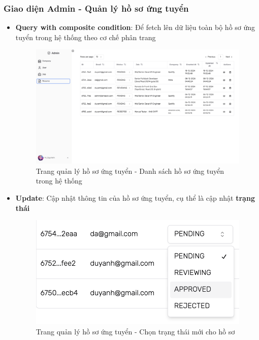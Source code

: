 \subsubsection{Giao diện Admin - Quản lý hồ sơ ứng tuyển}

\begin{itemize}
    \item \textbf{Query with composite condition}: Để fetch lên dữ liệu toàn bộ hồ sơ ứng tuyển trong hệ thống theo cơ chế phân trang
    \begin{figure}[H]
        \centering
        \includegraphics[width=\linewidth]{DBMS-Application/Images/admin-resume.png}
        \caption{Trang quản lý hồ sơ ứng tuyển - Danh sách hồ sơ ứng tuyển trong hệ thống}
        \label{fig:enter-label}
    \end{figure}

    \item \textbf{Update}: Cập nhật thông tin của hồ sơ ứng tuyển, cụ thể là cập nhật \textbf{trạng thái}
    \begin{figure}[H]
        \centering
        \includegraphics[width=.5\linewidth]{DBMS-Application/Images/update-status-resume.png}
        \caption{Trang quản lý hồ sơ ứng tuyển - Chọn trạng thái mới cho hồ sơ}
        \label{fig:enter-label}
    \end{figure}


\end{itemize}
